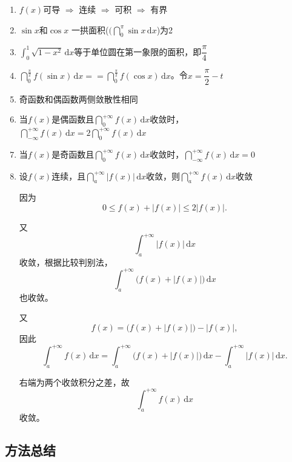 \documentclass[../book.tex]{subfiles}
\begin{document}
    \begin{enumerate}
        \item $f(x)$可导 $\Rightarrow$ 连续 $\Rightarrow$ 可积 $\Rightarrow$ 有界
        \item $\sin x$和$\cos x$ 一拱面积($(\dint_0^{\pi} \sin x\,\mathrm{d}x$)为2
        \item $\int_0^1 \sqrt{1 - x^2}\,\mathrm{d}x$等于单位圆在第一象限的面积，即$\dfrac{\pi}{4}$
        \item $\dint_0^{\frac{\pi}{2}} f(\sin x)\,\mathrm{d}x == \dint_0^{\frac{\pi}{2}} f(\cos x)\,\mathrm{d}x$。令$x = \dfrac{\pi}{2} - t$
        \item 奇函数和偶函数两侧敛散性相同
        \item 当$f(x)$是偶函数且$\dint_0^{+\infty} f(x)\,\mathrm{d}x$收敛时，$\dint_{-\infty}^{+\infty} f(x)\,\mathrm{d}x = 2\dint_0^{+\infty} f(x)\,\mathrm{d}x$
        \item 当$f(x)$是奇函数且$\dint_0^{+\infty} f(x)\,\mathrm{d}x$收敛时，$\dint_{-\infty}^{+\infty} f(x)\,\mathrm{d}x = 0$
        \item 设$f(x)$连续，且$\dint_a^{+\infty} |f(x)|\,\mathrm{d}x$收敛，则$\dint_a^{+\infty} f(x)\,\mathrm{d}x$收敛
        \begin{analysisbox}[证:]
            因为
            \[
                0 \le f(x)+|f(x)| \le 2|f(x)|.
            \]

            又
            \[
                \int_a^{+\infty} |f(x)|\,\mathrm{d}x
            \]
            收敛，根据比较判别法，
            \[
                \int_a^{+\infty} \bigl(f(x)+|f(x)|\bigr)\,\mathrm{d}x
            \]
            也收敛。

            又
            \[
                f(x)=\bigl(f(x)+|f(x)|\bigr)-|f(x)|,
            \]
            因此
            \[
                \int_a^{+\infty} f(x)\,\mathrm{d}x
                =
                \int_a^{+\infty} \bigl(f(x)+|f(x)|\bigr)\,\mathrm{d}x
                -
                \int_a^{+\infty} |f(x)|\,\mathrm{d}x.
            \]

            右端为两个收敛积分之差，故
            \[
                \int_a^{+\infty} f(x)\,\mathrm{d}x
            \]
            收敛。
        \end{analysisbox}
    \end{enumerate}

    \subsection{方法总结}
\end{document}
